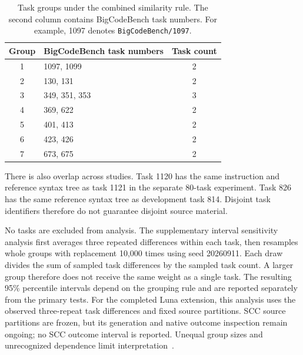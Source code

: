 \begin{table}[htbp]\centering
\caption{Task groups under the combined similarity rule. The second column contains BigCodeBench task numbers. For example, 1097 denotes \texttt{BigCodeBench/1097}.}
\label{tab:source-groups}
\begin{tabular}{clc}\toprule
Group & BigCodeBench task numbers & Task count\\\midrule
1 & 1097, 1099 & 2\\
2 & 130, 131 & 2\\
3 & 349, 351, 353 & 3\\
4 & 369, 622 & 2\\
5 & 401, 413 & 2\\
6 & 423, 426 & 2\\
7 & 673, 675 & 2\\\bottomrule
\end{tabular}
\end{table}

There is also overlap across studies. Task 1120 has the same instruction and reference syntax tree as task 1121 in the separate 80-task experiment. Task 826 has the same reference syntax tree as development task 814. Disjoint task identifiers therefore do not guarantee disjoint source material.

No tasks are excluded from analysis. The supplementary interval sensitivity analysis first averages three repeated differences within each task, then resamples whole groups with replacement 10,000 times using seed 20260911. Each draw divides the sum of sampled task differences by the sampled task count. A larger group therefore does not receive the same weight as a single task. The resulting 95\% percentile intervals depend on the grouping rule and are reported separately from the primary tests. For the completed Luna extension, this analysis uses the observed three-repeat task differences and fixed source partitions. SCC source partitions are frozen, but its generation and native outcome inspection remain ongoing; no SCC outcome interval is reported. Unequal group sizes and unrecognized dependence limit interpretation~\cite{mackinnon2023clusters}.
